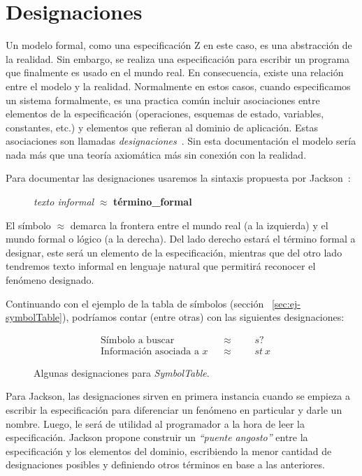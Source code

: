 \section{Designaciones}
\label{cap:designaciones}

Un modelo formal, como una especificación Z en este caso, es una abstracción de la realidad. Sin embargo, se realiza una especificación para escribir un programa que finalmente es usado en el mundo real. En consecuencia, existe una relación entre el modelo y la realidad.
Normalmente en estos casos, cuando especificamos un sistema formalmente, es una practica común incluir asociaciones entre elementos de la especificación (operaciones, esquemas de estado, variables, constantes, etc.) y elementos que refieran al dominio de aplicación. Estas asociaciones son llamadas \emph{designaciones}~\cite{jackson}.
Sin esta documentación el modelo sería nada más que una teoría axiomática más sin conexión con la realidad. 

Para documentar las designaciones usaremos la sintaxis propuesta por Jackson~\cite{jackson}:

\begin{figure}[H]
  \centering
  \emph{texto informal} $\approx$ \textbf{término\_formal}
\end{figure}

El símbolo $\approx$ demarca la frontera entre el mundo real (a la izquierda) y el mundo formal o lógico (a la derecha). Del lado derecho estará el término formal a designar, este será un elemento de la especificación, mientras que del otro lado tendremos texto informal en lenguaje natural que permitirá reconocer el fenómeno designado.

Continuando con el ejemplo de la tabla de símbolos (sección ~\ref{sec:ej-symbolTable}), podríamos contar (entre otras) con las siguientes designaciones:

\begin{figure}[H]
  \begin{align*} 
    &\text{Símbolo a buscar} && \approx &&&s? \\
    &\text{Información asociada a $x$} && \approx &&&st~x
  \end{align*}
  \caption{Algunas designaciones para \emph{SymbolTable}.}
  \label{fig:ej_designacion}
\end{figure}


Para Jackson, las designaciones sirven en primera instancia cuando se empieza a escribir la especificación para diferenciar un fenómeno en particular y darle un nombre. Luego, le será de utilidad al programador a la hora de leer la especificación. Jackson propone construir un \emph{``puente angosto''} entre la especificación y los elementos del dominio, escribiendo la menor cantidad de designaciones posibles y definiendo otros términos en base a las anteriores.


